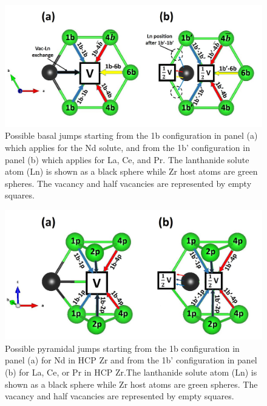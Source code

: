 \documentclass[preprint,12pt]{elsarticle}
\begin{document}
\begin{figure}[h!]
    \centering
    \includegraphics[scale=0.5]{basal_jumps_1b_1bb.jpg}
    \caption{Possible basal jumps starting from the 1b configuration in panel (a) which applies for the Nd solute, and from the 1b' configuration in panel (b) which applies for La, Ce, and Pr. The lanthanide solute atom (Ln) is shown as a black sphere while Zr host atoms are green spheres. The vacancy and half vacancies are represented by empty squares. }
    \label{fig:basal_jumps_1b_and_1bb}
\end{figure}

\begin{figure}[h!]
    \centering
    \includegraphics[scale=0.5]{pyramidal_jumps_1b_1bb.jpg}
    \caption{Possible pyramidal jumps starting from the 1b configuration in panel (a) for Nd in HCP Zr and from the 1b' configuration in panel (b) for La, Ce, or Pr in HCP Zr.The lanthanide solute atom (Ln) is shown as a black sphere while Zr host atoms are green spheres. The vacancy and half vacancies are represented by empty squares.}
    \label{fig:pyr_jumps_1b_and_1bb}
\end{figure}
\end{document}
